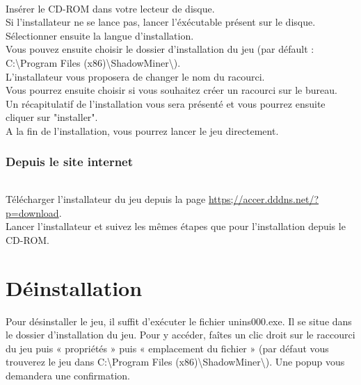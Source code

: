 \documentclass[titlepage, 13px, a4paper]{report}
\begin{document}
\paragraph*{} \hspace{0pt}
Insérer le CD-ROM dans votre lecteur de disque. \\
Si l'installateur ne se lance pas, lancer l'éxécutable présent sur le disque. \\
Sélectionner ensuite la langue d'installation. \\
Vous pouvez ensuite choisir le dossier d'installation du jeu 
(par défault : C:\textbackslash Program Files (x86)\textbackslash ShadowMiner\textbackslash). \\
L'installateur vous proposera de changer le nom du racourci. \\
Vous pourrez ensuite choisir si vous souhaitez créer un racourci sur le bureau. \\
Un récapitulatif de l'installation vous sera présenté et vous pourrez ensuite cliquer sur "installer". \\
A la fin de l'installation, vous pourrez lancer le jeu directement. \\

\section{Depuis le site internet}
\paragraph*{} \hspace{0pt}
Télécharger l'installateur du jeu depuis la page \url{https;//accer.dddns.net/?p=download}. \\
Lancer l'installateur et suivez les mêmes étapes que pour l'installation depuis le CD-ROM. \\



\newpage


\part{Déinstallation} 

Pour désinstaller le jeu, il suffit d'exécuter le fichier unins000.exe. 
Il se situe dans le dossier d'installation du jeu. Pour y accéder, faîtes un clic droit sur le 
raccourci du jeu puis « propriétés » puis « emplacement du fichier » (par défaut vous trouverez le jeu dans 
C:\textbackslash Program Files (x86)\textbackslash ShadowMiner\textbackslash). 
Une popup vous demandera une confirmation.\\
\end{document}
